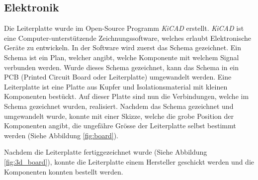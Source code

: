 \subsection{Elektronik} \label{cap:methoden_leiterplatte}
Die Leiterplatte wurde im Open-Source Programm \textit{KiCAD} erstellt. \textit{KiCAD} ist eine Computer-unterstützende Zeichnungssoftware, welches erlaubt Elektronische Geräte zu entwickeln. In der Software wird zuerst das Schema gezeichnet. Ein Schema ist ein Plan, welcher angibt, welche Komponente mit welchem Signal verbunden werden. Wurde dieses Schema gezeichnet, kann das Schema in ein PCB (Printed Circuit Board oder Leiterplatte) umgewandelt werden. Eine Leiterplatte ist eine Platte aus Kupfer und Isolationsmaterial mit kleinen Komponenten bestückt. Auf dieser Platte sind nun die Verbindungen, welche im Schema gezeichnet wurden, realisiert.
\newpara
Nachdem das Schema gezeichnet und umgewandelt wurde, konnte mit einer Skizze, welche die grobe Position der Komponenten angibt, die ungefähre Grösse der Leiterplatte selbst bestimmt werden (Siehe Abbildung \ref{fig:board}).

\newpage

Nachdem die Leiterplatte fertiggezeichnet wurde (Siehe Abbildung \ref{fig:3d_board}), konnte die Leiterplatte einem Hersteller geschickt werden und die Komponenten konnten bestellt werden.